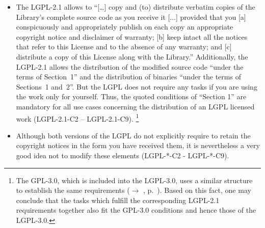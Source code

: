 \begin{itemize}
  
\item The LGPL-2.1 allows to \enquote{[\ldots] copy and (to) distribute
  verbatim copies of the Library's complete source code as you receive it [...]
  provided that you 
  [a] conspicuously and appropriately publish on each copy an appropriate
  copyright notice and disclaimer of warranty; 
  [b] keep intact all the notices that refer to this License and to the absence
  of any warranty; and 
  [c] distribute a copy of this License along with the Library.}
  Additionally, the LGPL-2.1 allows the distribution of the modified source code
  \enquote{under the terms of Section~1} and the distribution
  of binaries \enquote{under the terms of Sections~1 and~2}.
  But the LGPL does not require any tasks if you are using the work only for
  yourself. Thus, the quoted conditions of \enquote{Section 1} are mandatory for
  all use cases concerning the distribution of an LGPL licensed work
  (LGPL-2.1-C2 -- LGPL-2.1-C9).
  \footnote{The GPL-3.0, which is included into the LGPL-3.0, uses a similar
    structure to establish the same requirements ($\rightarrow$ \oslic, p.\ 
    \pageref{Gpl3ConditionsDistri}). Based on this fact, one may conclude that
    the tasks which fulfill the corresponding LGPL-2.1 requirements together
    also fit the GPL-3.0 conditions and hence those of the LGPL-3.0.}

\item Although both versions of the LGPL do not explicitly require to retain the
  copyright notices in the form you have received them, it is nevertheless a
  very good idea not to modify these elements (LGPL-*-C2 - LGPL-*-C9).
  

\end{itemize}
